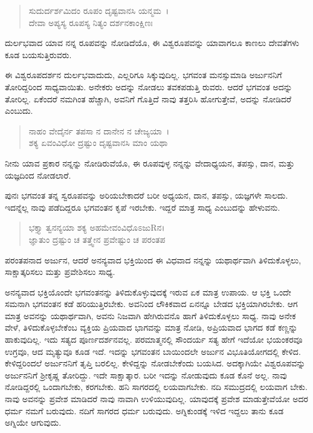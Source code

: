 \begin{verse}
ಸುದುರ್ದರ್ಶಮಿದಂ ರೂಪಂ ದೃಷ್ಟವಾನಸಿ ಯನ್ಮಮ~।\\ದೇವಾ ಅಪ್ಯಸ್ಯ ರೂಪಸ್ಯ ನಿತ್ಯಂ ದರ್ಶನಕಾಂಕ್ಷಿಣಃ 
\end{verse}

{\small ದುರ್ಲಭವಾದ ಯಾವ ನನ್ನ ರೂಪವನ್ನು ನೋಡಿದೆಯೊ, ಈ ವಿಶ್ವರೂಪವನ್ನು ಯಾವಾಗಲೂ ಕಾಣಲು ದೇವತೆಗಳು ಕೂಡ ಬಯಸುತ್ತಿರುವರು.}

ಈ ವಿಶ್ವರೂಪದರ್ಶನ ದುರ್ಲಭವಾದುದು, ಎಲ್ಲರಿಗೂ ಸಿಕ್ಕುವುದಿಲ್ಲ. ಭಗವಂತ ಮನಸ್ಸುಮಾಡಿ ಅರ್ಜುನನಿಗೆ ತೋರಿದ್ದರಿಂದ ಸಾಧ್ಯವಾಯಿತು. ಅನೇಕರು ಅದನ್ನು ನೋಡಲು ತವಕಪಡುತ್ತಿ ರುವರು. ಆದರೆ ಭಗವಂತ ಅದನ್ನು ತೋರಿಲ್ಲ. ಏಕೆಂದರೆ ನಮಗಿಂತ ಹೆಚ್ಚಾಗಿ, ಅವನಿಗೆ ಗೊತ್ತಿದೆ ನಾವು ತತ್ತರಿಸಿ ಹೋಗುತ್ತೇವೆ, ಅದನ್ನು ನೋಡಿದರೆ ಎಂಬುದು.

\begin{verse}
ನಾಹಂ ವೇದೈರ್ನ ತಪಸಾ ನ ದಾನೇನ ನ ಚೇಜ್ಯಯಾ~।\\ಶಕ್ಯ ಏವಂವಿಧೋ ದ್ರಷ್ಟುಂ ದೃಷ್ಟವಾನಸಿ ಮಾಂ ಯಥಾ 
\end{verse}

{\small ನೀನು ಯಾವ ಪ್ರಕಾರ ನನ್ನನ್ನು ನೋಡಿರುವೆಯೊ, ಈ ರೂಪವುಳ್ಳ ನನ್ನನ್ನು ವೇದಾಧ್ಯಯನ, ತಪಸ್ಸು, ದಾನ, ಮತ್ತು ಯಜ್ಞದಿಂದ ನೋಡಲಾರೆ.}

ಪುನಃ ಭಗವಂತ ತನ್ನ ಸ್ವರೂಪವನ್ನು ಅರಿಯಬೇಕಾದರೆ ಬರೀ ಅಧ್ಯಯನ, ದಾನ, ತಪಸ್ಸು, ಯಜ್ಞಗಳೇ ಸಾಲದು. ಇದನ್ನೆಲ್ಲ ನಾವು ಪಡೆದಿದ್ದರೂ ಭಗವಂತನ ಕೃಪೆ ಇರಬೇಕು. ಇದ್ದರೆ ಮಾತ್ರ ಸಾಧ್ಯ ಎಂಬುದನ್ನು ಹೇಳುವನು.

\begin{verse}
ಭಕ್ತ್ಯಾ ತ್ವನನ್ಯಯಾ ಶಕ್ಯ ಅಹಮೇವಂವಿಧೊಽಜುRನ।\\ಜ್ಞಾತುಂ ದ್ರಷ್ಟುಂ ಚ ತತ್ತ್ವೇನ ಪ್ರವೇಷ್ಟುಂ ಚ ಪರಂತಪ 
\end{verse}

{\small ಪರಂತಪನಾದ ಅರ್ಜುನ, ಆದರೆ ಅನನ್ಯವಾದ ಭಕ್ತಿಯಿಂದ ಈ ವಿಧವಾದ ನನ್ನನ್ನು ಯಥಾರ್ಥವಾಗಿ ತಿಳಿದುಕೊಳ್ಳಲು, ಸಾಕ್ಷಾತ್ಕರಿಸಲು ಮತ್ತು ಪ್ರವೇಶಿಸಲು ಸಾಧ್ಯ.}

ಅನನ್ಯವಾದ ಭಕ್ತಿಯೊಂದೇ ಭಗವಂತನನ್ನು ತಿಳಿದುಕೊಳ್ಳುವುದಕ್ಕೆ ಇರುವ ಏಕ ಮಾತ್ರ ಉಪಾಯ. ಆ ಭಕ್ತಿ ಒಂದೇ ಸಮನಾಗಿ ಭಗವಂತನ ಕಡೆ ಹರಿಯುತ್ತಿರಬೇಕು. ಅವನಿಂದ ಲೌಕಿಕವಾದ ಏನನ್ನೂ ಬೇಡದ ಭಕ್ತಿಯಾಗಿರಬೇಕು. ಆಗ ಮಾತ್ರ ಅವನನ್ನು ಯಥಾರ್ಥವಾಗಿ, ಅವನು ನಿಜವಾಗಿ ಹೇಗಿರುವನೊ ಹಾಗೆ ತಿಳಿದುಕೊಳ್ಳಲು ಸಾಧ್ಯ. ನಾವು ಅನೇಕ ವೇಳೆ, ತಿಳಿದುಕೊಳ್ಳಬೇಕೆಂಬ ವ್ಯಕ್ತಿಯ ಪ್ರಿಯವಾದ ಭಾಗವನ್ನು ಮಾತ್ರ ನೋಡಿ, ಅಪ್ರಿಯವಾದ ಭಾಗದ ಕಡೆ ಕಣ್ಣನ್ನು ಹಾಕುವುದಿಲ್ಲ. ಇದು ಸತ್ಯದ ಪೂರ್ಣದರ್ಶನವಲ್ಲ. ಪರಮಾತ್ಮನಲ್ಲಿ ಸೌಂದರ್ಯ ಸತ್ಯ ಹೇಗೆ ಇದೆಯೋ ಭಯಂಕರವೂ ಉಗ್ರವೂ, ಆದ ಮೃತ್ಯುವೂ ಕೂಡ ಇದೆ. ಇದನ್ನು ಭಗವಂತನ ಬಾಯಿಂದಲೇ ಅರ್ಜುನ ವಿಭೂತಿಯೋಗದಲ್ಲಿ ಕೇಳಿದ. ಕೇಳಿದ್ದರಿಂದಲೆ ಅರ್ಜುನನಿಗೆ ತೃಪ್ತಿ ಬರಲಿಲ್ಲ. ಕೇಳಿದ್ದನ್ನು ನೋಡಬೇಕೆಂದು ಬಯಸಿದ. ಅದಕ್ಕಾಗಿಯೇ ವಿಶ್ವರೂಪವನ್ನು ಅರ್ಜುನನಿಗೆ ಶ‍್ರೀಕೃಷ್ಣ ತೋರಿದ್ದು. ಇದೇ ಸಾಕ್ಷಾತ್ಕಾರ. ಬರೀ ಇದನ್ನು ನೋಡುವುದು ಕೂಡ ಕೊನೆ ಅಲ್ಲ. ನಾವು ನೋಡಿದ್ದರಲ್ಲಿ ಒಂದಾಗಬೇಕು, ಕರಗಬೇಕು. ಹನಿ ಸಾಗರದಲ್ಲಿ ಲಯವಾಗಬೇಕು. ನದಿ ಸಮುದ್ರದಲ್ಲಿ ಲಯವಾಗ ಬೇಕು. ನಾವು ಅವನನ್ನು ಪ್ರವೇಶ ಮಾಡಿದರೆ ನಾವು ನಾವಾಗಿ ಉಳಿಯುವುದಿಲ್ಲ. ಯಾವುದಕ್ಕೆ ಪ್ರವೇಶ ಮಾಡುತ್ತೇವೆಯೋ ಅದರ ಧರ್ಮ ನಮಗೆ ಬರುವುದು. ನದಿಗೆ ಸಾಗರದ ಧರ್ಮ ಬರುವುದು. ಅಗ್ನಿಕುಂಡಕ್ಕೆ ಇಳಿದ ಇದ್ದಲು ತಾನು ಕೂಡ ಅಗ್ನಿಯೇ ಆಗುವುದು.

